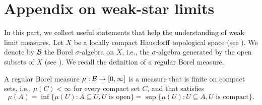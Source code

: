 
\section{Appendix on weak-star limits}

\label{sec:app:weak star limits}

In this part, we collect useful statements that help the understanding of weak limit measures. Let $X$ be a locally compact Hausdorff topological space (see \cite[p31, p104]{lee2011IntroductionTopologicalManifolds}). We denote by $\mathcal{B}$ the Borel $\sigma$-algebra on $X$, i.e., the $\sigma$-algebra generated by the open subsets of $X$ (see \cite[Section 15]{halmos1950MeasureTheory}). We recall the definition of a regular Borel measure.
\begin{definition}\cite[Section 52]{halmos1950MeasureTheory}
    A regular Borel measure $\mu : \mathcal{B} \to [0, \infty]$ is a measure that is finite on compact sets, i.e., $\mu(C) < \infty$ for every compact set $C$, and that satisfies
        \begin{equation}
            \mu(A) = \inf \{\mu(U) : A \subseteq U, U \text{ is open}\} =  \sup \{\mu(U) : U \subseteq A, U \text{ is compact}\}.
        \end{equation}
\end{definition}

